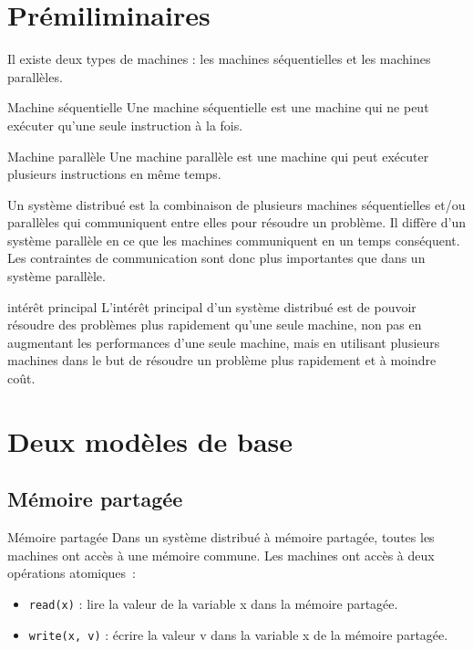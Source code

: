 \section{Prémiliminaires}

Il existe deux types de machines : les machines séquentielles et les machines parallèles.

\begin{definition}{}{Machine séquentielle}
    Une machine séquentielle est une machine qui ne peut exécuter qu'une seule instruction à la fois.
\end{definition}

\begin{definition}{}{Machine parallèle}
    Une machine parallèle est une machine qui peut exécuter plusieurs instructions en même temps.
\end{definition}

Un système distribué est la combinaison de plusieurs machines séquentielles et/ou parallèles qui communiquent entre elles pour résoudre un problème. Il diffère d'un système parallèle en ce que les machines communiquent en un temps conséquent. Les contraintes de communication sont donc plus importantes que dans un système parallèle.

\begin{remarque}{}{intérêt principal}
    L'intérêt principal d'un système distribué est de pouvoir résoudre des problèmes plus rapidement qu'une seule machine, non pas en augmentant les performances d'une seule machine, mais en utilisant plusieurs machines dans le but de résoudre un problème plus rapidement et à moindre coût.
\end{remarque}

\section{Deux modèles de base}

\subsection{Mémoire partagée}

\begin{definition}{}{Mémoire partagée}
  Dans un système distribué à mémoire partagée, toutes les machines ont accès à une mémoire commune. Les machines ont accès à deux opérations atomiques~:
  \begin{itemize}
    \item \texttt{read(x)} : lire la valeur de la variable x dans la mémoire partagée.
    \item \texttt{write(x, v)} : écrire la valeur v dans la variable x de la mémoire partagée.
  \end{itemize}
\end{definition}

